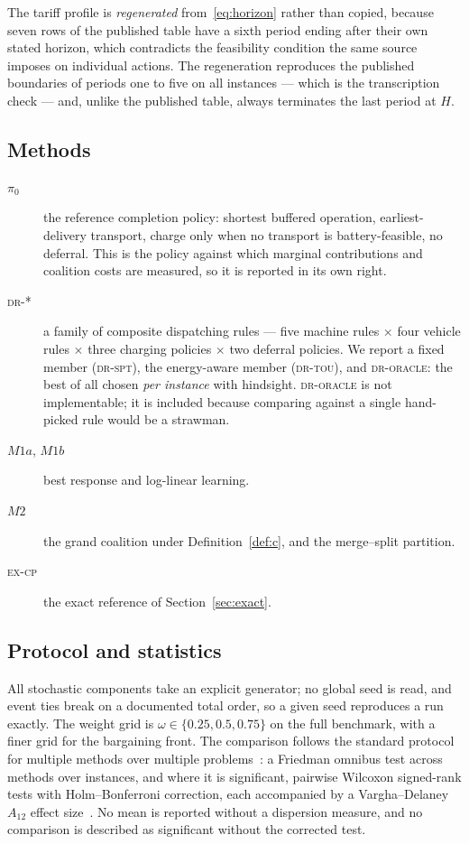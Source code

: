 \documentclass[preprint, 3p, review, 12pt]{elsarticle}
\theoremstyle{definition}
\begin{document}
The tariff profile is \emph{regenerated} from~\eqref{eq:horizon} rather than copied, because
seven rows of the published table have a sixth period ending after their own stated horizon,
which contradicts the feasibility condition the same source imposes on individual actions.
The regeneration reproduces the published boundaries of periods one to five on all
 instances --- which is the transcription check --- and, unlike the
published table, always terminates the last period at $H$.

\subsection{Methods}
\begin{description}
\item[$\pi_0$] the reference completion policy: shortest buffered operation, earliest-delivery
transport, charge only when no transport is battery-feasible, no deferral. This is the policy
against which marginal contributions and coalition costs are measured, so it is reported in
its own right.
\item[\textsc{dr-*}] a family of  composite dispatching rules --- five
machine rules $\times$ four vehicle rules $\times$ three charging policies $\times$ two
deferral policies. We report a fixed member (\textsc{dr-spt}), the energy-aware member
(\textsc{dr-tou}), and \textsc{dr-oracle}: the best of all  chosen
\emph{per instance} with hindsight. \textsc{dr-oracle} is not implementable; it is included
because comparing against a single hand-picked rule would be a strawman.
\item[$M1a$, $M1b$] best response and log-linear learning.
\item[$M2$] the grand coalition under Definition~\ref{def:c}, and the merge--split partition.
\item[\textsc{ex-cp}] the exact reference of Section~\ref{sec:exact}.
\end{description}

\subsection{Protocol and statistics}
All stochastic components take an explicit generator; no global seed is read, and event ties
break on a documented total order, so a given seed reproduces a run exactly. The weight grid
is $\omega\in\{0.25,0.5,0.75\}$ on the full benchmark, with a finer grid for the bargaining
front. The comparison follows the standard protocol for multiple methods over multiple
problems~\citep{demsar2006statistical}: a Friedman omnibus test across methods over
instances, and where it is significant, pairwise Wilcoxon signed-rank tests with
Holm--Bonferroni correction, each accompanied by a Vargha--Delaney $A_{12}$ effect
size~\citep{vargha2000critique}. No mean is reported without a dispersion measure, and no
comparison is described as significant without the corrected test.
\end{document}
